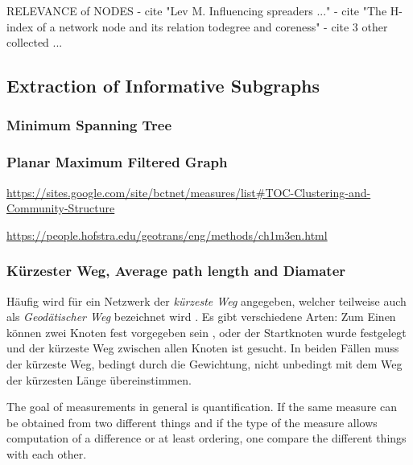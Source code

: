 \documentclass[a4paper,10pt]{scrbook}
\begin{document}

RELEVANCE of NODES
- cite "Lev M. Influencing spreaders ..."
- cite "The H-index of a network node and its relation todegree and coreness"
- cite 3 other collected ...



\subsection{Extraction of Informative Subgraphs}

\subsubsection{Minimum Spanning Tree}
\cite{Kruskal1956}



\subsubsection{Planar Maximum Filtered Graph}

\url{https://sites.google.com/site/bctnet/measures/list#TOC-Clustering-and-Community-Structure}

\url{https://people.hofstra.edu/geotrans/eng/methods/ch1m3en.html}

\subsubsection*{Kürzester Weg, Average path length and Diamater}
Häufig wird für ein Netzwerk der \textit{kürzeste Weg} angegeben, welcher teilweise auch als \textit{Geodätischer Weg} bezeichnet wird \cite{Newman}. Es gibt verschiedene Arten: Zum Einen können zwei Knoten fest vorgegeben sein \cite{ShortestPath}, oder der Startknoten wurde festgelegt und der kürzeste Weg zwischen allen Knoten ist gesucht. In beiden Fällen muss der kürzeste Weg, bedingt durch die Gewichtung, nicht unbedingt mit dem Weg der kürzesten Länge übereinstimmen. 



The goal of measurements in general is quantification. If the same measure can be obtained from two different things and if the type of the measure allows computation of a difference or at least ordering, one compare the different things with each other. 
\end{document}
